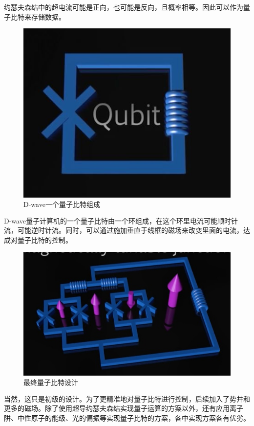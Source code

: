\documentclass{article}
\begin{document}
约瑟夫森结中的超电流可能是正向，也可能是反向，且概率相等。因此可以作为量子比特来存储数据。
\begin{figure}[H]
  \centering
  \includegraphics[width=0.5\linewidth]{figures/D-wave一个量子比特组成}
  \caption{D-wave一个量子比特组成}
\end{figure}
D-wave量子计算机的一个量子比特由一个环组成，在这个环里电流可能顺时针流，可能逆时针流。同时，可以通过施加垂直于线框的磁场来改变里面的电流，达成对量子比特的控制。
\begin{figure}[H]
  \centering
  \includegraphics[width=0.7\linewidth]{figures/最终量子比特设计}
  \caption{最终量子比特设计}
\end{figure}
当然，这只是初级的设计。为了更精准地对量子比特进行控制，后续加入了势井和更多的磁场。除了使用超导约瑟夫森结实现量子运算的方案以外，还有应用离子阱、中性原子的能级、光的偏振等实现量子比特的方案，各中实现方案各有优劣。
\end{document}

